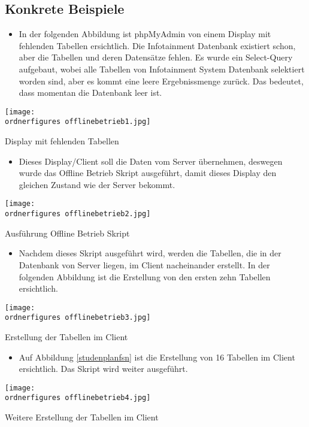 \subsection{Konkrete Beispiele}
\begin{itemize}
	\item In der folgenden Abbildung ist phpMyAdmin von einem Display mit fehlenden Tabellen ersichtlich. Die Infotainment Datenbank existiert schon, aber die Tabellen und deren Datens\"atze fehlen. Es wurde ein Select-Query aufgebaut, wobei alle Tabellen von Infotainment System Datenbank selektiert worden sind, aber es kommt eine leere Ergebnissmenge zur\"uck. Das bedeutet, dass momentan die Datenbank leer ist.
\end{itemize}
\begin{center}
	\captionsetup{type=figure}
	\texttt{[image: \\ordnerfigures offlinebetrieb1.jpg]}
	\caption{Display mit fehlenden Tabellen}
	\label{dsp} 
\end{center}
\begin{itemize}
	\item Dieses Display/Client soll die Daten vom Server \"ubernehmen, deswegen wurde das Offline Betrieb Skript ausgef\"uhrt, damit dieses Display den gleichen Zustand wie der Server bekommt.
\end{itemize}
\begin{center}
	\captionsetup{type=figure}
	\texttt{[image: \\ordnerfigures offlinebetrieb2.jpg]}
	\caption{Ausf\"uhrung Offline Betrieb Skript}
	\label{Ofl} 
\end{center}
\begin{itemize}
	\item Nachdem dieses Skript ausgef\"uhrt wird, werden die Tabellen, die in der Datenbank von Server liegen, im Client nacheinander erstellt. In der folgenden Abbildung ist die Erstellung von den ersten zehn Tabellen ersichtlich.  
\end{itemize}
\begin{center}
	\captionsetup{type=figure}
	\texttt{[image: \\ordnerfigures offlinebetrieb3.jpg]}
	\caption{Erstellung der Tabellen im Client}
	\label{stundenplanfsn} 
\end{center}
\begin{itemize}
	\item Auf Abbildung \ref{studenplanfsn} ist die Erstellung von 16 Tabellen im Client ersichtlich. Das Skript wird weiter ausgef\"uhrt. 
\end{itemize}
\begin{center}
	\captionsetup{type=figure}
	\texttt{[image: \\ordnerfigures offlinebetrieb4.jpg]}
	\caption{Weitere Erstellung der Tabellen im Client}
	\label{studenplanfsn} 
\end{center}
